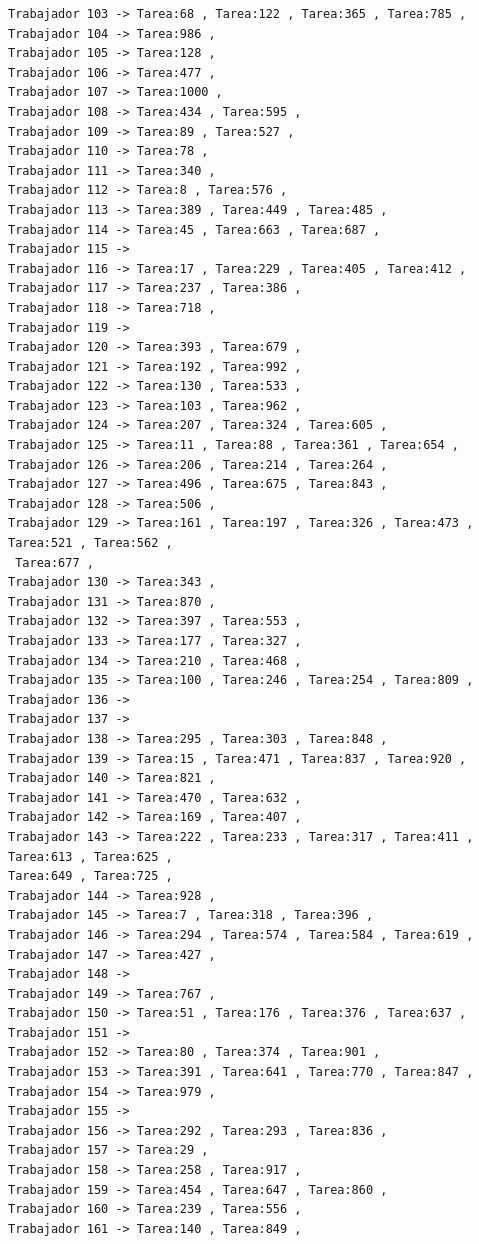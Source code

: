 \documentclass{article}
\begin{document}
\begin{lstlisting}
Trabajador 103 -> Tarea:68 , Tarea:122 , Tarea:365 , Tarea:785 , 
Trabajador 104 -> Tarea:986 , 
Trabajador 105 -> Tarea:128 , 
Trabajador 106 -> Tarea:477 , 
Trabajador 107 -> Tarea:1000 , 
Trabajador 108 -> Tarea:434 , Tarea:595 , 
Trabajador 109 -> Tarea:89 , Tarea:527 , 
Trabajador 110 -> Tarea:78 , 
Trabajador 111 -> Tarea:340 , 
Trabajador 112 -> Tarea:8 , Tarea:576 , 
Trabajador 113 -> Tarea:389 , Tarea:449 , Tarea:485 , 
Trabajador 114 -> Tarea:45 , Tarea:663 , Tarea:687 , 
Trabajador 115 -> 
Trabajador 116 -> Tarea:17 , Tarea:229 , Tarea:405 , Tarea:412 , 
Trabajador 117 -> Tarea:237 , Tarea:386 , 
Trabajador 118 -> Tarea:718 , 
Trabajador 119 -> 
Trabajador 120 -> Tarea:393 , Tarea:679 , 
Trabajador 121 -> Tarea:192 , Tarea:992 , 
Trabajador 122 -> Tarea:130 , Tarea:533 , 
Trabajador 123 -> Tarea:103 , Tarea:962 , 
Trabajador 124 -> Tarea:207 , Tarea:324 , Tarea:605 , 
Trabajador 125 -> Tarea:11 , Tarea:88 , Tarea:361 , Tarea:654 , 
Trabajador 126 -> Tarea:206 , Tarea:214 , Tarea:264 , 
Trabajador 127 -> Tarea:496 , Tarea:675 , Tarea:843 , 
Trabajador 128 -> Tarea:506 , 
Trabajador 129 -> Tarea:161 , Tarea:197 , Tarea:326 , Tarea:473 , Tarea:521 , Tarea:562 ,
 Tarea:677 , 
Trabajador 130 -> Tarea:343 , 
Trabajador 131 -> Tarea:870 , 
Trabajador 132 -> Tarea:397 , Tarea:553 , 
Trabajador 133 -> Tarea:177 , Tarea:327 , 
Trabajador 134 -> Tarea:210 , Tarea:468 , 
Trabajador 135 -> Tarea:100 , Tarea:246 , Tarea:254 , Tarea:809 , 
Trabajador 136 -> 
Trabajador 137 -> 
Trabajador 138 -> Tarea:295 , Tarea:303 , Tarea:848 , 
Trabajador 139 -> Tarea:15 , Tarea:471 , Tarea:837 , Tarea:920 , 
Trabajador 140 -> Tarea:821 , 
Trabajador 141 -> Tarea:470 , Tarea:632 , 
Trabajador 142 -> Tarea:169 , Tarea:407 , 
Trabajador 143 -> Tarea:222 , Tarea:233 , Tarea:317 , Tarea:411 , Tarea:613 , Tarea:625 , 
Tarea:649 , Tarea:725 , 
Trabajador 144 -> Tarea:928 , 
Trabajador 145 -> Tarea:7 , Tarea:318 , Tarea:396 , 
Trabajador 146 -> Tarea:294 , Tarea:574 , Tarea:584 , Tarea:619 , 
Trabajador 147 -> Tarea:427 , 
Trabajador 148 -> 
Trabajador 149 -> Tarea:767 , 
Trabajador 150 -> Tarea:51 , Tarea:176 , Tarea:376 , Tarea:637 , 
Trabajador 151 -> 
Trabajador 152 -> Tarea:80 , Tarea:374 , Tarea:901 , 
Trabajador 153 -> Tarea:391 , Tarea:641 , Tarea:770 , Tarea:847 , 
Trabajador 154 -> Tarea:979 , 
Trabajador 155 -> 
Trabajador 156 -> Tarea:292 , Tarea:293 , Tarea:836 , 
Trabajador 157 -> Tarea:29 , 
Trabajador 158 -> Tarea:258 , Tarea:917 , 
Trabajador 159 -> Tarea:454 , Tarea:647 , Tarea:860 , 
Trabajador 160 -> Tarea:239 , Tarea:556 , 
Trabajador 161 -> Tarea:140 , Tarea:849 , 

\end{lstlisting}
\end{document}
